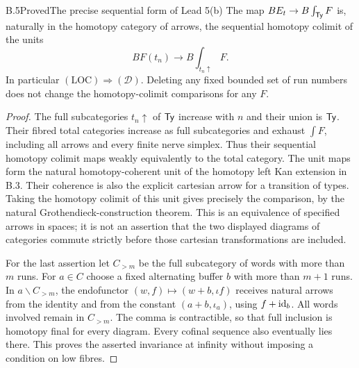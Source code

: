 \begin{claim}{B.5}{Proved}{The precise sequential form of Lead 5(b)}
\label{B:infinity}
The map $BE_t\to B\int_{\mathsf{Ty}}F$ is, naturally in the homotopy
category of arrows, the sequential homotopy colimit of the units
\[
 BF(t_n)\longrightarrow B\int_{t_n\uparrow}F.
\]
In particular $(\mathrm{LOC})\Rightarrow(\mathcal D)$.
Deleting any fixed bounded set of run numbers does not change
the homotopy-colimit comparisons for any $F$.
\end{claim}
\begin{proof}
The full subcategories $t_n\uparrow$ of $\mathsf{Ty}$ increase with $n$
and their union is $\mathsf{Ty}$. Their fibred total categories increase
as full subcategories and exhaust $\int F$, including all arrows
and every finite nerve simplex. Thus their sequential homotopy
colimit maps weakly equivalently to the total category. The unit
maps form the natural homotopy-coherent unit of the homotopy left
Kan extension in B.3. Their coherence is also the explicit
cartesian arrow for a transition of types. Taking the homotopy
colimit of this unit gives precisely the comparison, by the
natural Grothendieck-construction theorem. This is an equivalence
of specified arrows in spaces; it is not an assertion that the
two displayed diagrams of categories commute strictly before
those cartesian transformations are included.

For the last assertion let $C_{>m}$ be the full subcategory of
words with more than $m$ runs. For $a\in C$ choose a fixed
alternating buffer $b$ with more than $m+1$ runs. In
$a\backslash C_{>m}$, the endofunctor $(w,f)\mapsto(w+b,\iota f)$
receives natural arrows from the identity and from the constant
$(a+b,\iota_a)$, using $f+\mathrm{id}_b$. All words involved remain
in $C_{>m}$. The comma is contractible, so that full inclusion
is homotopy final for every diagram. Every cofinal sequence also
eventually lies there. This proves the asserted invariance at
infinity without imposing a condition on low fibres.
\end{proof}

